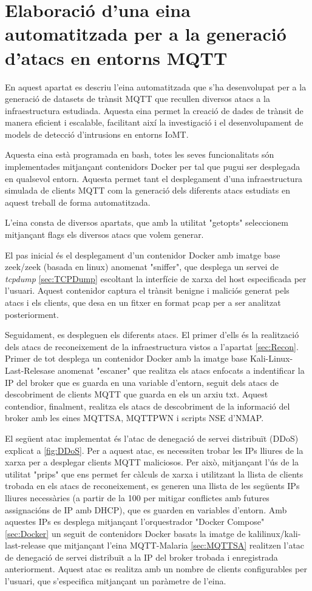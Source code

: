 \chapter{Elaboració d'una eina automatitzada per a la generació d'atacs en entorns MQTT}
\label{sec:tool}
En aquest apartat es descriu l'eina automatitzada que s'ha desenvolupat per a la generació de datasets de trànsit MQTT que recullen diversos atacs a la infraestructura estudiada. Aquesta eina permet la creació de dades de trànsit de manera eficient i escalable, facilitant així la investigació i el desenvolupament de models de detecció d'intrusions en entorns IoMT.

Aquesta eina està programada en bash, totes les seves funcionalitats són implementades mitjançant contenidors Docker per tal que pugui ser desplegada en qualsevol entorn. Aquesta permet tant el desplegament d'una infraestructura simulada de clients MQTT com la generació dels diferents atacs estudiats en aquest treball de forma automatitzada.

L'eina consta de diversos apartats, que amb la utilitat "getopts" seleccionem mitjançant flags els diversos atacs que volem generar.

El pas inicial és el desplegament d'un contenidor Docker amb imatge base zeek/zeek (basada en linux) anomenat "sniffer", que desplega un servei de \textit{tcpdump} \ref{sec:TCPDump} escoltant la interfície de xarxa del host especificada per l'usuari. Aquest contenidor captura el trànsit benigne i maliciós generat pels atacs i els clients, que desa en un fitxer en format pcap per a ser analitzat posteriorment.

Seguidament, es despleguen els diferents atacs. El primer d'ells és la realització dels atacs de reconeixement de la infraestructura vistos a l'apartat \ref{sec:Recon}. Primer de tot desplega un contenidor Docker amb la imatge base Kali-Linux-Last-Relesase anomenat "escaner" que realitza els atacs enfocats a indentificar la IP del broker que es guarda en una variable d'entorn, seguit dels atacs de descobriment de clients MQTT que guarda en els un arxiu txt. Aquest contendior, finalment, realitza els atacs de descobriment de la informació del broker amb les eines MQTTSA, MQTTPWN i scripts NSE d'NMAP.

El següent atac implementat és l'atac de denegació de servei distribuït (DDoS) explicat a \ref{fig:DDoS}. Per a aquest atac, es necessiten trobar les IPs lliures de la xarxa per a desplegar clients MQTT maliciosos. Per això, mitjançant l'ús de la utilitat "prips" que ens permet fer càlculs de xarxa i utilitzant la llista de clients trobada en els atacs de reconeixement, es generen una llista de les següents IPs lliures necessàries (a partir de la 100 per mitigar conflictes amb futures assignacións de IP amb DHCP), que es guarden en variables d'entorn. Amb aquestes IPs es desplega mitjançant l'orquestrador "Docker Compose" \ref{sec:Docker} un seguit de contenidors Docker basats la imatge de kalilinux/kali-last-release que mitjançant l'eina MQTT-Malaria \ref{sec:MQTTSA} realitzen l'atac de denegació de servei distribuït a la IP del broker trobada i enregistrada anteriorment. Aquest atac es realitza amb un nombre de clients configurables per l'usuari, que s'especifica mitjançant un paràmetre de l'eina.

